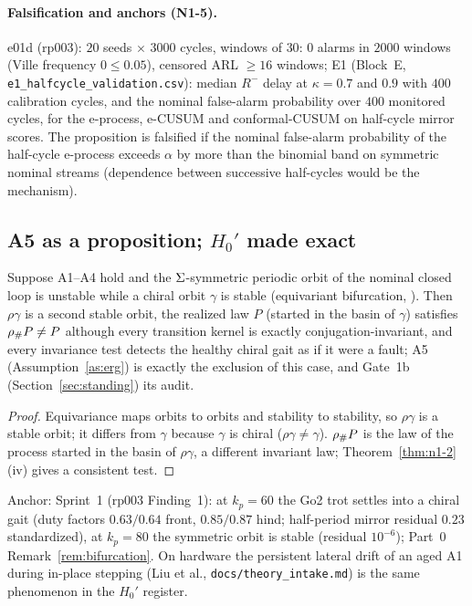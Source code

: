 \paragraph{Falsification and anchors (N1-5).}
e01d (rp003): $20$ seeds $\times$ $3000$ cycles, windows of $30$: $0$ alarms
in $2000$ windows (Ville frequency $0 \le 0.05$), censored ARL $\ge 16$
windows; E1 (Block~E, \texttt{e1\_halfcycle\_validation.csv}): median
$R^-$ delay at $\kappa = 0.7$ and $0.9$ with $400$ calibration cycles, and
the nominal false-alarm probability over $400$ monitored cycles, for the
e-process, e-CUSUM and conformal-CUSUM on half-cycle mirror scores. The
proposition is falsified if the nominal false-alarm probability of the
half-cycle e-process exceeds $\alpha$ by more than the binomial band on
symmetric nominal streams (dependence between successive half-cycles would
be the mechanism).

\subsection{A5 as a proposition; \texorpdfstring{$H_0'$}{H0'} made exact}
\label{sec:p1-h0prime}

\begin{proposition}
\label{prop:chiral}
Suppose A1--A4 hold and the $\Sigma$-symmetric periodic orbit of the
nominal closed loop is unstable while a chiral orbit $\gamma$ is stable
(equivariant bifurcation, \cite{golubitsky2002symmetry}). Then $\rho\gamma$
is a second stable orbit, the realized law $P$ (started in the basin of
$\gamma$) satisfies ${\rho}_{\#}P \neq P$ although every transition kernel
is exactly conjugation-invariant, and every invariance test detects the
healthy chiral gait as if it were a fault; A5 (Assumption~\ref{as:erg}) is
exactly the exclusion of this case, and Gate~1b (Section~\ref{sec:standing})
its audit.
\end{proposition}

\begin{proof}
Equivariance maps orbits to orbits and stability to stability, so
$\rho\gamma$ is a stable orbit; it differs from $\gamma$ because $\gamma$
is chiral ($\rho\gamma \neq \gamma$). ${\rho}_{\#}P$ is the law of the
process started in the basin of $\rho\gamma$, a different invariant law;
Theorem~\ref{thm:n1-2}(iv) gives a consistent test.
\end{proof}

Anchor: Sprint~1 (rp003 Finding~1): at $k_p = 60$ the Go2 trot settles into a
chiral gait (duty factors $0.63/0.64$ front, $0.85/0.87$ hind; half-period
mirror residual $0.23$ standardized), at $k_p = 80$ the symmetric orbit is
stable (residual $10^{-6}$); Part~0 Remark~\ref{rem:bifurcation}. On
hardware the persistent lateral drift of an aged A1 during in-place stepping
(Liu et al., \texttt{docs/theory\_intake.md}) is the same phenomenon in the
$H_0'$ register.

